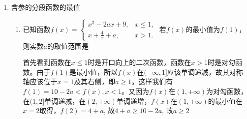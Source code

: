 \begin{enumerate}
\begin{enumerate}
\begin{jieda}
        得 $\left\{\begin{array}{l}-a \leq-1 \\ 2-a>0 \\ 1-2 a \geq-(2-a)+2 a-5\end{array}\right.$,解得 $1 \leq a \leq \frac{8}{5}$,
        所以实数 $a$ 的取值范围是 $1 \leq a \leq \frac{8}{5}$.
        故答案为: $1 \leq a \leq \frac{8}{5}$ \\
        \ps 分段函数严格单调增等价于各段都严格增，且在端点处相连或者满足“更上一层楼型”
        \end{jieda}
        \item 已知函数$f(x) = \left \{ \begin{array}{ll}
             (2-5a)^x & x < 1  \\
             \frac{a}{x} + 5 & x \geq 1
        \end{array}\right.$ 在$\mathbf{R}$上严格递增，则实数$a$的取值范围是\blkda{$[-\frac{1}{2}, 0)$} .
        \begin{jieda}
            函数$f(x)$在$\mathbf{R}$上严格递增的充要条件为$\left \{ \begin{array}{l}
             2-5a > 1  \\
             a < 0 \\
             a + 5 \geq 2 - 5a
        \end{array}\right.$，解得$a \in [-\frac{1}{2}, 0)$
        \end{jieda}
    \end{enumerate}
    \item 含参的分段函数的最值
    \begin{enumerate}
    \item 已知函数$f(x) = \left\{  
         \begin{array}{ll}  
            x^2-2ax+9, & x \leq 1, \\  
            x+\frac{4}{x}+a, & x > 1.
         \end{array}
    \right.$ 若$f(x)$的最小值为$f(1)$，则实数$a$的取值范围是\blkda{$[2, +\infty)$}
    \begin{jieda}
        首先看到函数在$x \leq 1$时是开口向上的二次函数，函数在$x > 1$时是对勾函数。由于$f(1)$是最小值，所以$f(x)$在$(-\infty, 1]$应该单调递减，故其对称轴应该位于$x=1$及其右侧，即$a \geq 1$。这样我们有$f(1) = 10-2a < f(x), x < 1$。又因为$f(x)$在$(1, +\infty)$为对勾函数，在$(1, 2]$单调递减，在$(2, +\infty)$单调递增，$f(x)$在$(1, +\infty)$的最小值在$x = 2$取得，$f(2) = 4+a$, 故$4+a \geq 10-2a$, 故$a \geq 2$ \\

\end{jieda}
\end{enumerate}
\end{enumerate}
